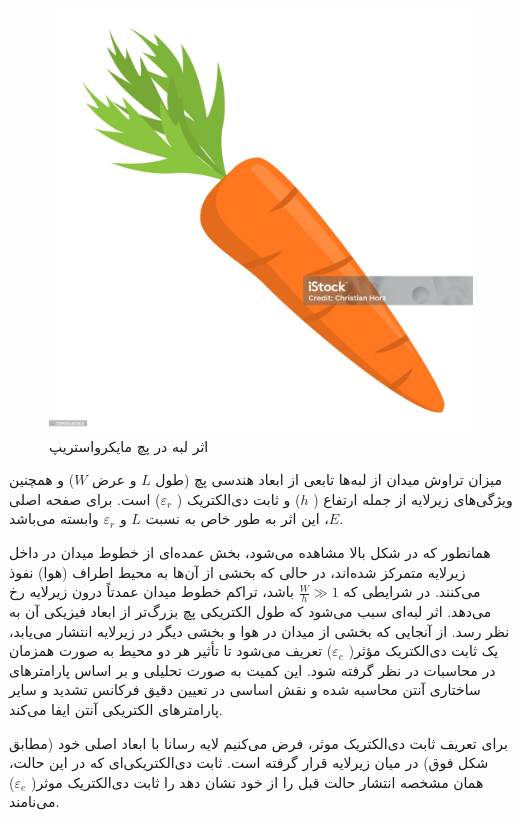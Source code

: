 \begin{figure}
	\centering
	\includegraphics[scale=0.3]{Images/aaa.jpg}
	\caption{اثر لبه در پچ مایکرواستریپ}
	\label{fig8}
\end{figure}

میزان تراوش میدان از لبه‌ها تابعی از ابعاد هندسی پچ (طول
$L$
 و عرض
$W$)
 و همچنین ویژگی‌های زیرلایه از جمله ارتفاع (
$h$)
 و ثابت دی‌الکتریک (
 $\varepsilon_r$)
 است. برای صفحه اصلی
 $E$،
  این اثر به طور خاص به نسبت
$L$
  و
$\varepsilon_r$
 وابسته می‌باشد.


همانطور که در شکل بالا مشاهده می‌شود، بخش عمده‌ای از خطوط میدان در داخل زیرلایه متمرکز شده‌اند، در حالی که بخشی از آن‌ها به محیط اطراف (هوا) نفوذ می‌کنند. در شرایطی که
$ \frac{W}{h} \gg 1$
 باشد، تراکم خطوط میدان عمدتاً درون زیرلایه رخ می‌دهد. اثر لبه‌ای سبب می‌شود که طول الکتریکی پچ بزرگ‌تر از ابعاد فیزیکی آن به نظر رسد. از آنجایی که بخشی از میدان در هوا و بخشی دیگر در زیرلایه انتشار می‌یابد، یک ثابت دی‌الکتریک مؤثر(
$\varepsilon_{e}$)
 تعریف می‌شود تا تأثیر هر دو محیط به صورت همزمان در محاسبات در نظر گرفته شود. این کمیت به صورت تحلیلی و بر اساس پارامترهای ساختاری آنتن محاسبه شده و نقش اساسی در تعیین دقیق فرکانس تشدید و سایر پارامترهای الکتریکی آنتن ایفا می‌کند.


برای تعریف ثابت دی‌الکتریک موثر، فرض می‌کنیم لایه رسانا با ابعاد اصلی خود (مطابق شکل فوق) در میان زیرلایه قرار گرفته است. ثابت دی‌الکتریکی‌ای که در این حالت، همان مشخصه انتشار حالت قبل را از خود نشان دهد را ثابت دی‌الکتریک موثر(
$\varepsilon_{e}$)
می‌نامند.


